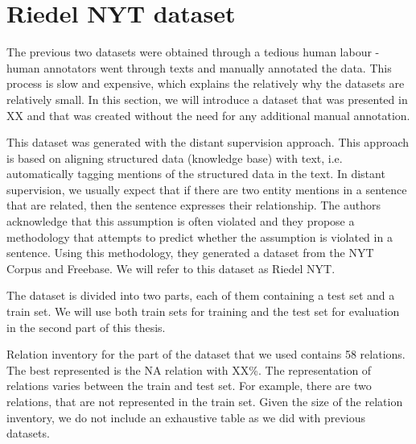 



\section{Riedel NYT dataset}
The previous two datasets were obtained through a tedious human labour - human annotators went through texts and manually annotated the data. This process is slow and expensive, which explains the relatively why the datasets are relatively small. In this section, we will introduce a dataset that was presented in XX and that was created without the need for any additional manual annotation.


This dataset was generated with the distant supervision approach. This approach is based on aligning structured data (knowledge base) with text, i.e. automatically tagging mentions of the structured data in the text. In distant supervision, we usually expect that if there are two entity mentions in a sentence that are related, then the sentence expresses their relationship. The authors acknowledge that this assumption is often violated and they propose a methodology that attempts to predict whether the assumption is violated in a sentence. Using this methodology, they generated a dataset from the NYT Corpus  and Freebase. We will refer to this dataset as Riedel NYT.

The dataset is divided into two parts, each of them containing a test set and a train set. We will use both train sets for training and the  test set for evaluation in the second part of this thesis.


Relation inventory for the part of the dataset that we used contains 58 relations. The best represented is the NA relation with XX\%. The representation of relations varies between the train and test set. For example, there are two relations, that are not represented in the train set. Given the size of the relation inventory, we do not include an exhaustive table as we did with previous datasets.  



